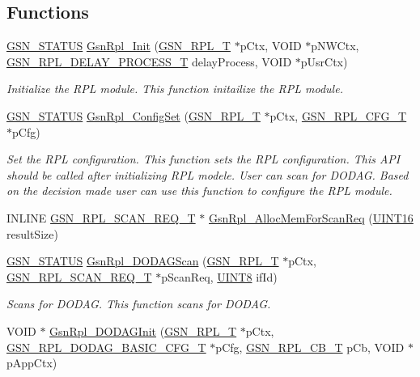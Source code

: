 \subsection*{Functions}
\begin{DoxyCompactItemize}
\item 
\hyperlink{a00660_gada5951904ac6110b1fa95e51a9ddc217}{GSN\_\-STATUS} \hyperlink{a00579_a253a379d07f6f65294baf40853c9f6a4}{GsnRpl\_\-Init} (\hyperlink{a00192}{GSN\_\-RPL\_\-T} $\ast$pCtx, VOID $\ast$pNWCtx, \hyperlink{a00579_af0ccdfb14b5152fb661e14482e16d4e7}{GSN\_\-RPL\_\-DELAY\_\-PROCESS\_\-T} delayProcess, VOID $\ast$pUsrCtx)
\begin{DoxyCompactList}\small\item\em Initialize the RPL module. This function initailize the RPL module. \end{DoxyCompactList}\item 
\hyperlink{a00660_gada5951904ac6110b1fa95e51a9ddc217}{GSN\_\-STATUS} \hyperlink{a00579_a2e7b3df50960e25ae214ae2b047edac4}{GsnRpl\_\-ConfigSet} (\hyperlink{a00192}{GSN\_\-RPL\_\-T} $\ast$pCtx, \hyperlink{a00197}{GSN\_\-RPL\_\-CFG\_\-T} $\ast$pCfg)
\begin{DoxyCompactList}\small\item\em Set the RPL configuration. This function sets the RPL configuration. This API should be called after initializing RPL modele. User can scan for DODAG. Based on the decision made user can use this function to configure the RPL module. \end{DoxyCompactList}\item 
INLINE \hyperlink{a00209}{GSN\_\-RPL\_\-SCAN\_\-REQ\_\-T} $\ast$ \hyperlink{a00579_acc339c3e4c927379c92fc8adb59dab93}{GsnRpl\_\-AllocMemForScanReq} (\hyperlink{a00660_ga09f1a1fb2293e33483cc8d44aefb1eb1}{UINT16} resultSize)
\item 
\hyperlink{a00660_gada5951904ac6110b1fa95e51a9ddc217}{GSN\_\-STATUS} \hyperlink{a00579_aaaf34f4d9a523ed282b50cf4a24bbfbd}{GsnRpl\_\-DODAGScan} (\hyperlink{a00192}{GSN\_\-RPL\_\-T} $\ast$pCtx, \hyperlink{a00209}{GSN\_\-RPL\_\-SCAN\_\-REQ\_\-T} $\ast$pScanReq, \hyperlink{a00660_gab27e9918b538ce9d8ca692479b375b6a}{UINT8} ifId)
\begin{DoxyCompactList}\small\item\em Scans for DODAG. This function scans for DODAG. \end{DoxyCompactList}\item 
VOID $\ast$ \hyperlink{a00579_a73cba07b377ef998cc7057253b3a4683}{GsnRpl\_\-DODAGInit} (\hyperlink{a00192}{GSN\_\-RPL\_\-T} $\ast$pCtx, \hyperlink{a00198}{GSN\_\-RPL\_\-DODAG\_\-BASIC\_\-CFG\_\-T} $\ast$pCfg, \hyperlink{a00579_aed305ee504daf71b35d8db4dfd6d3de3}{GSN\_\-RPL\_\-CB\_\-T} pCb, VOID $\ast$pAppCtx)

\end{DoxyCompactItemize}
